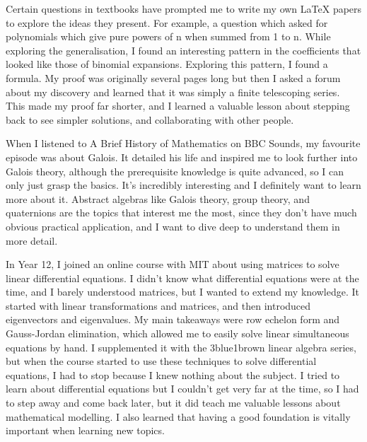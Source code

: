 \documentclass[a4paper, 12pt]{article}
\newenvironment{personalstatement}{\directlua{startPersonalStatement()}}{\directlua{stopPersonalStatement()}}
\begin{document}
\begin{personalstatement}
Certain questions in textbooks have prompted me to write my own LaTeX papers to explore the ideas they present. For example, a question which asked for polynomials which give pure powers of n when summed from 1 to n. While exploring the generalisation, I found an interesting pattern in the coefficients that looked like those of binomial expansions. Exploring this pattern, I found a formula. My proof was originally several pages long but then I asked a forum about my discovery and learned that it was simply a finite telescoping series. This made my proof far shorter, and I learned a valuable lesson about stepping back to see simpler solutions, and collaborating with other people.

When I listened to A Brief History of Mathematics on BBC Sounds, my favourite episode was about Galois. It detailed his life and inspired me to look further into Galois theory, although the prerequisite knowledge is quite advanced, so I can only just grasp the basics. It's incredibly interesting and I definitely want to learn more about it. Abstract algebras like Galois theory, group theory, and quaternions are the topics that interest me the most, since they don't have much obvious practical application, and I want to dive deep to understand them in more detail.

In Year 12, I joined an online course with MIT about using matrices to solve linear differential equations. I didn't know what differential equations were at the time, and I barely understood matrices, but I wanted to extend my knowledge. It started with linear transformations and matrices, and then introduced eigenvectors and eigenvalues. My main takeaways were row echelon form and Gauss-Jordan elimination, which allowed me to easily solve linear simultaneous equations by hand. I supplemented it with the 3blue1brown linear algebra series, but when the course started to use these techniques to solve differential equations, I had to stop because I knew nothing about the subject. I tried to learn about differential equations but I couldn't get very far at the time, so I had to step away and come back later, but it did teach me valuable lessons about mathematical modelling. I also learned that having a good foundation is vitally important when learning new topics.
\end{personalstatement}

\end{document}
